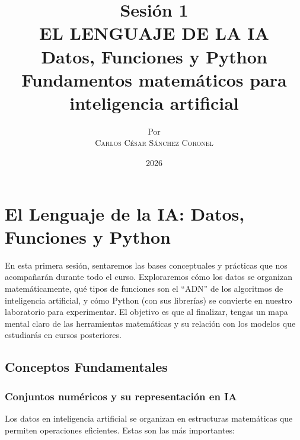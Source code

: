 \documentclass[12pt,a4paper,openany,oneside]{book}
\title{
    \textbf{Sesión 1} \\ 
    \Huge \textbf{EL LENGUAJE DE LA IA} \\
    \Large Datos, Funciones y Python \\
    \normalsize Fundamentos matemáticos para inteligencia artificial
}
\author{
    \small Por \\ \vspace{0.2cm}
    \Large \textsc{Carlos César Sánchez Coronel}
}
\date{2026}
\begin{document}
\maketitle
\tableofcontents
{}

\chapter{El Lenguaje de la IA: Datos, Funciones y Python}

En esta primera sesión, sentaremos las bases conceptuales y prácticas que nos acompañarán durante todo el curso. Exploraremos cómo los datos se organizan matemáticamente, qué tipos de funciones son el ``ADN'' de los algoritmos de inteligencia artificial, y cómo Python (con sus librerías) se convierte en nuestro laboratorio para experimentar. El objetivo es que al finalizar, tengas un mapa mental claro de las herramientas matemáticas y su relación con los modelos que estudiarás en cursos posteriores.

\section{Conceptos Fundamentales}

\subsection{Conjuntos numéricos y su representación en IA}
Los datos en inteligencia artificial se organizan en estructuras matemáticas que permiten operaciones eficientes. Estas son las más importantes:
\end{document}
